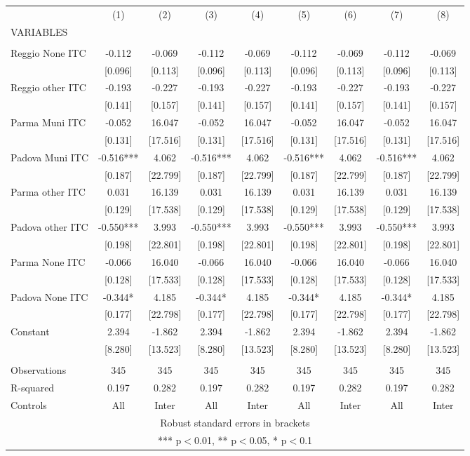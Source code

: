\begin{tabular}{lcccccccc} \hline
 & (1) & (2) & (3) & (4) & (5) & (6) & (7) & (8) \\
VARIABLES &  &  &  &  &  &  &  &  \\ \hline
 &  &  &  &  &  &  &  &  \\
Reggio None ITC & -0.112 & -0.069 & -0.112 & -0.069 & -0.112 & -0.069 & -0.112 & -0.069 \\
 & [0.096] & [0.113] & [0.096] & [0.113] & [0.096] & [0.113] & [0.096] & [0.113] \\
Reggio other ITC & -0.193 & -0.227 & -0.193 & -0.227 & -0.193 & -0.227 & -0.193 & -0.227 \\
 & [0.141] & [0.157] & [0.141] & [0.157] & [0.141] & [0.157] & [0.141] & [0.157] \\
Parma Muni ITC & -0.052 & 16.047 & -0.052 & 16.047 & -0.052 & 16.047 & -0.052 & 16.047 \\
 & [0.131] & [17.516] & [0.131] & [17.516] & [0.131] & [17.516] & [0.131] & [17.516] \\
Padova Muni ITC & -0.516*** & 4.062 & -0.516*** & 4.062 & -0.516*** & 4.062 & -0.516*** & 4.062 \\
 & [0.187] & [22.799] & [0.187] & [22.799] & [0.187] & [22.799] & [0.187] & [22.799] \\
Parma other ITC & 0.031 & 16.139 & 0.031 & 16.139 & 0.031 & 16.139 & 0.031 & 16.139 \\
 & [0.129] & [17.538] & [0.129] & [17.538] & [0.129] & [17.538] & [0.129] & [17.538] \\
Padova other ITC & -0.550*** & 3.993 & -0.550*** & 3.993 & -0.550*** & 3.993 & -0.550*** & 3.993 \\
 & [0.198] & [22.801] & [0.198] & [22.801] & [0.198] & [22.801] & [0.198] & [22.801] \\
Parma None ITC & -0.066 & 16.040 & -0.066 & 16.040 & -0.066 & 16.040 & -0.066 & 16.040 \\
 & [0.128] & [17.533] & [0.128] & [17.533] & [0.128] & [17.533] & [0.128] & [17.533] \\
Padova None ITC & -0.344* & 4.185 & -0.344* & 4.185 & -0.344* & 4.185 & -0.344* & 4.185 \\
 & [0.177] & [22.798] & [0.177] & [22.798] & [0.177] & [22.798] & [0.177] & [22.798] \\
Constant & 2.394 & -1.862 & 2.394 & -1.862 & 2.394 & -1.862 & 2.394 & -1.862 \\
 & [8.280] & [13.523] & [8.280] & [13.523] & [8.280] & [13.523] & [8.280] & [13.523] \\
 &  &  &  &  &  &  &  &  \\
Observations & 345 & 345 & 345 & 345 & 345 & 345 & 345 & 345 \\
R-squared & 0.197 & 0.282 & 0.197 & 0.282 & 0.197 & 0.282 & 0.197 & 0.282 \\
 Controls & All & Inter & All & Inter & All & Inter & All & Inter \\ \hline
\multicolumn{9}{c}{ Robust standard errors in brackets} \\
\multicolumn{9}{c}{ *** p$<$0.01, ** p$<$0.05, * p$<$0.1} \\
\end{tabular}
